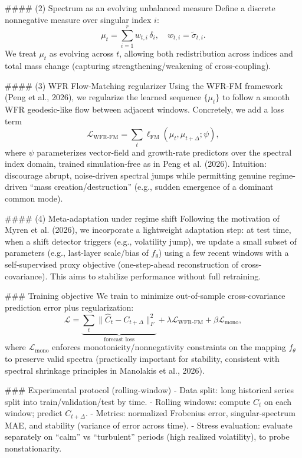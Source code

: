 #### (2) Spectrum as an evolving unbalanced measure  
Define a discrete nonnegative measure over singular index \(i\):  
\[
\mu_t = \sum_{i=1}^r w_{t,i}\,\delta_{i}, \quad w_{t,i} = \tilde{\sigma}_{t,i}.
\]
We treat \(\mu_t\) as evolving across \(t\), allowing both redistribution across indices and total mass change (capturing strengthening/weakening of cross-coupling).

#### (3) WFR Flow-Matching regularizer  
Using the WFR-FM framework (Peng et al., 2026), we regularize the learned sequence \(\{\mu_t\}\) to follow a smooth WFR geodesic-like flow between adjacent windows. Concretely, we add a loss term
\[
\mathcal{L}_{\text{WFR-FM}} = \sum_t \ell_{\text{FM}}(\mu_t, \mu_{t+\Delta}; \psi),
\]
where \(\psi\) parameterizes vector-field and growth-rate predictors over the spectral index domain, trained simulation-free as in Peng et al. (2026). Intuition: discourage abrupt, noise-driven spectral jumps while permitting genuine regime-driven “mass creation/destruction” (e.g., sudden emergence of a dominant common mode).

#### (4) Meta-adaptation under regime shift  
Following the motivation of Myren et al. (2026), we incorporate a lightweight adaptation step: at test time, when a shift detector triggers (e.g., volatility jump), we update a small subset of parameters (e.g., last-layer scale/bias of \(f_\theta\)) using a few recent windows with a self-supervised proxy objective (one-step-ahead reconstruction of cross-covariance). This aims to stabilize performance without full retraining.

### Training objective  
We train to minimize out-of-sample cross-covariance prediction error plus regularization:
\[
\mathcal{L} = \underbrace{\sum_t \| \widehat{C}_t - C_{t+\Delta}\|_F^2}_{\text{forecast loss}}
+ \lambda \mathcal{L}_{\text{WFR-FM}}
+ \beta \mathcal{L}_{\text{mono}},
\]
where \(\mathcal{L}_{\text{mono}}\) enforces monotonicity/nonnegativity constraints on the mapping \(f_\theta\) to preserve valid spectra (practically important for stability, consistent with spectral shrinkage principles in Manolakis et al., 2026).

### Experimental protocol (rolling-window)  
- Data split: long historical series split into train/validation/test by time.  
- Rolling windows: compute \(C_t\) on each window; predict \(C_{t+\Delta}\).  
- Metrics: normalized Frobenius error, singular-spectrum MAE, and stability (variance of error across time).  
- Stress evaluation: evaluate separately on “calm” vs “turbulent” periods (high realized volatility), to probe nonstationarity.


